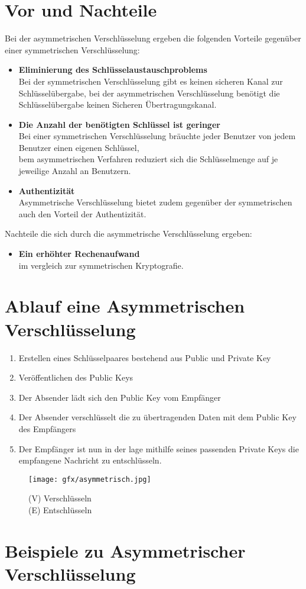 \section{Vor und Nachteile}
Bei der asymmetrischen Verschlüsselung ergeben die folgenden Vorteile gegenüber einer symmetrischen Verschlüsselung:
\begin{itemize}
    \item \textbf{Eliminierung des Schlüsselaustauschproblems} \\ Bei der symmetrischen Verschlüsselung gibt es keinen sicheren Kanal zur Schlüsselübergabe, bei der asymmetrischen Verschlüsselung benötigt die Schlüsselübergabe keinen Sicheren Übertragungskanal.\citep{paar:2016}
    \item \textbf{Die Anzahl der benötigten Schlüssel ist geringer} \\ Bei einer symmetrischen Verschlüsselung bräuchte jeder Benutzer von jedem Benutzer einen eigenen Schlüssel,
    \\bem asymmetrischen Verfahren reduziert sich die Schlüsselmenge auf je jeweilige Anzahl an Benutzern.\citep{paar:2016}
    \item \textbf{Authentizität} \\ Asymmetrische Verschlüsselung bietet zudem gegenüber der symmetrischen auch den Vorteil der Authentizität.
\end{itemize}
Nachteile die sich durch die asymmetrische Verschlüsselung ergeben:

\begin{itemize}
    \item \textbf{Ein erhöhter Rechenaufwand} \\ im vergleich zur symmetrischen Kryptografie.
\end{itemize}

\section{Ablauf eine Asymmetrischen Verschlüsselung}
\begin{enumerate}
    \item Erstellen eines Schlüsselpaares bestehend aus Public und Private Key
    \item Veröffentlichen des Public Keys
    \item Der Absender lädt sich den Public Key vom Empfänger
    \item Der Absender verschlüsselt die zu übertragenden Daten mit dem Public Key des Empfängers
    \item Der Empfänger ist nun in der lage mithilfe seines passenden Private Keys die empfangene Nachricht zu entschlüsseln.
\end{enumerate}

\begin{figure}[ht]
	\centering
  \texttt{[image: gfx/asymmetrisch.jpg]}
	\caption{(V) Verschlüsseln\\(E) Entschlüsseln}
\end{figure}
\newpage

\section{Beispiele zu Asymmetrischer Verschlüsselung}